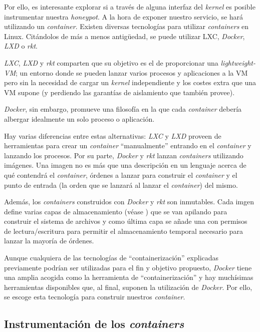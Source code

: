 Por ello, es interesante explorar si a través de alguna interfaz del \emph{kernel} es posible instrumentar nuestra \emph{honeypot}. A la hora de exponer nuestro servicio, se hará utilizando
un \emph{container}. Existen diversas tecnologías para utilizar \emph{containers} en Linux. Citándolos de más a menos antigüedad, se puede utilizar LXC, \emph{Docker}, \emph{LXD} o \emph{rkt}.

\emph{LXC}, \emph{LXD} y \emph{rkt} comparten que su objetivo es el de proporcionar una \emph{lightweight-VM}; un entorno donde se pueden lanzar varios procesos y aplicaciones a la VM
pero sin la necesidad de cargar un \emph{kernel} independiente y los costes extra que una VM supone (y perdiendo las garantías de aislamiento que también provee).

\emph{Docker}, sin embargo, promueve una filosofía en la que cada \emph{container} debería albergar idealmente un solo proceso o aplicación.

Hay varias diferencias entre estas alternativas: \emph{LXC} y \emph{LXD} proveen de herramientas para crear un \emph{container} ``manualmente'' entrando en el \emph{container} y lanzando los procesos. Por su parte, \emph{Docker} y \emph{rkt}
lanzan \emph{containers} utilizando imágenes. Una imagen no es más que una descripción en un lenguaje acerca de qué contendrá el \emph{container}, órdenes a lanzar para construir el \emph{container} y el punto de entrada (la orden que se lanzará al lanzar el \emph{container}) del mismo.

Además, los \emph{containers} construidos con \emph{Docker} y \emph{rkt} son inmutables. Cada imgen define varias capas de almacenamiento (véase \cite{docker-storage}) que se van apilando
para construir el sistema de archivos y como última capa se añade una con permisos de lectura/escritura para permitir el almacenamiento temporal necesario para lanzar
la mayoría de órdenes.

Aunque cualquiera de las tecnologías de ``containerización'' explicadas previamente podrían ser utilizadas para el fin y objetivo propuesto, \emph{Docker} tiene una amplia acogida como la herramienta de ``containerización''
y hay muchísimas herramientas disponibles que, al final, suponen la utilización de \emph{Docker}. Por ello, se escoge esta tecnología para construir nuestros \emph{container}.

\subsection{Instrumentación de los \emph{containers}}
\label{subsec:instrumentacion-containers}

